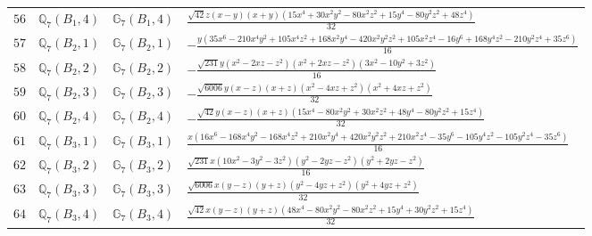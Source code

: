 \documentclass[fleqn,8pt,landscape]{jsarticle}
\begin{document}
\begin{table}[ht!]
\begin{center}
\begin{tabular}{cccl}
$ 56 $ & $ \mathbb{Q}_{7}(B_{1},4) $ & $ \mathbb{G}_{7}(B_{1},4) $ & $ \frac{\sqrt{42} z \left(x - y\right) \left(x + y\right) \left(15 x^{4} + 30 x^{2} y^{2} - 80 x^{2} z^{2} + 15 y^{4} - 80 y^{2} z^{2} + 48 z^{4}\right)}{32} $ \\
$ 57 $ & $ \mathbb{Q}_{7}(B_{2},1) $ & $ \mathbb{G}_{7}(B_{2},1) $ & $ - \frac{y \left(35 x^{6} - 210 x^{4} y^{2} + 105 x^{4} z^{2} + 168 x^{2} y^{4} - 420 x^{2} y^{2} z^{2} + 105 x^{2} z^{4} - 16 y^{6} + 168 y^{4} z^{2} - 210 y^{2} z^{4} + 35 z^{6}\right)}{16} $ \\
$ 58 $ & $ \mathbb{Q}_{7}(B_{2},2) $ & $ \mathbb{G}_{7}(B_{2},2) $ & $ - \frac{\sqrt{231} y \left(x^{2} - 2 x z - z^{2}\right) \left(x^{2} + 2 x z - z^{2}\right) \left(3 x^{2} - 10 y^{2} + 3 z^{2}\right)}{16} $ \\
$ 59 $ & $ \mathbb{Q}_{7}(B_{2},3) $ & $ \mathbb{G}_{7}(B_{2},3) $ & $ - \frac{\sqrt{6006} y \left(x - z\right) \left(x + z\right) \left(x^{2} - 4 x z + z^{2}\right) \left(x^{2} + 4 x z + z^{2}\right)}{32} $ \\
$ 60 $ & $ \mathbb{Q}_{7}(B_{2},4) $ & $ \mathbb{G}_{7}(B_{2},4) $ & $ - \frac{\sqrt{42} y \left(x - z\right) \left(x + z\right) \left(15 x^{4} - 80 x^{2} y^{2} + 30 x^{2} z^{2} + 48 y^{4} - 80 y^{2} z^{2} + 15 z^{4}\right)}{32} $ \\
$ 61 $ & $ \mathbb{Q}_{7}(B_{3},1) $ & $ \mathbb{G}_{7}(B_{3},1) $ & $ \frac{x \left(16 x^{6} - 168 x^{4} y^{2} - 168 x^{4} z^{2} + 210 x^{2} y^{4} + 420 x^{2} y^{2} z^{2} + 210 x^{2} z^{4} - 35 y^{6} - 105 y^{4} z^{2} - 105 y^{2} z^{4} - 35 z^{6}\right)}{16} $ \\
$ 62 $ & $ \mathbb{Q}_{7}(B_{3},2) $ & $ \mathbb{G}_{7}(B_{3},2) $ & $ \frac{\sqrt{231} x \left(10 x^{2} - 3 y^{2} - 3 z^{2}\right) \left(y^{2} - 2 y z - z^{2}\right) \left(y^{2} + 2 y z - z^{2}\right)}{16} $ \\
$ 63 $ & $ \mathbb{Q}_{7}(B_{3},3) $ & $ \mathbb{G}_{7}(B_{3},3) $ & $ \frac{\sqrt{6006} x \left(y - z\right) \left(y + z\right) \left(y^{2} - 4 y z + z^{2}\right) \left(y^{2} + 4 y z + z^{2}\right)}{32} $ \\
$ 64 $ & $ \mathbb{Q}_{7}(B_{3},4) $ & $ \mathbb{G}_{7}(B_{3},4) $ & $ \frac{\sqrt{42} x \left(y - z\right) \left(y + z\right) \left(48 x^{4} - 80 x^{2} y^{2} - 80 x^{2} z^{2} + 15 y^{4} + 30 y^{2} z^{2} + 15 z^{4}\right)}{32} $ \\
 \hline \hline
\end{tabular}
\end{center}
\end{table}
\end{document}
